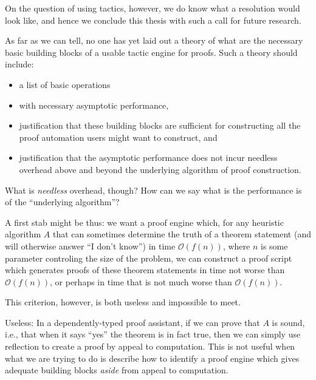 On the question of using tactics, however, we do know what a resolution would look like, and hence we conclude this thesis with such a call for future research.

As far as we can tell, no one has yet laid out a theory of what are the necessary basic building blocks of a usable tactic engine for proofs.
Such a theory should include:
\begin{itemize}
\item
  a list of basic operations
\item
  with necessary asymptotic performance,
\item
  justification that these building blocks are sufficient for constructing all the proof automation users might want to construct, and
\item
  justification that the asymptotic performance does not incur needless overhead above and beyond the underlying algorithm of proof construction.
\end{itemize}

What is \emph{needless} overhead, though?
How can we say what is the performance is of the ``underlying algorithm''?

A first stab might be thus: we want a proof engine which, for any heuristic algorithm $A$ that can sometimes determine the truth of a theorem statement (and will otherwise answer ``I don't know'') in time $\mathcal O(f(n))$, where $n$ is some parameter controling the size of the problem, we can construct a proof script which generates proofs of these theorem statements in time not worse than $\mathcal O(f(n))$, or perhaps in time that is not much worse than $\mathcal O(f(n))$.

This criterion, however, is both useless and impossible to meet.

Useless:
In a dependently-typed proof assistant, if we can prove that $A$ is sound, i.e., that when it says ``yes'' the theorem is in fact true, then we can simply use reflection to create a proof by appeal to computation.
This is not useful when what we are trying to do is describe how to identify a proof engine which gives adequate building blocks \emph{aside} from appeal to computation.

